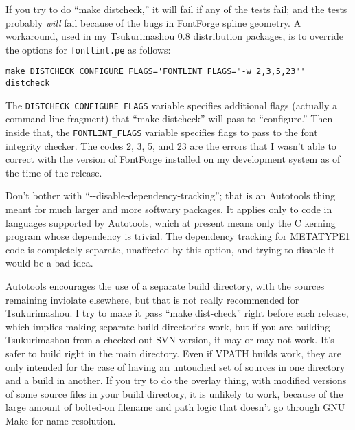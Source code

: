 \documentclass[14pt]{extarticle}
\begin{document}
If you try to do ``make distcheck,'' it will fail if any of the tests fail;
and the tests probably \emph{will} fail because of the bugs in FontForge
spline geometry.  A workaround, used in my Tsukurimashou 0.8 distribution
packages, is to override the options for \texttt{fontlint.pe} as follows:
\begin{verbatim}
make DISTCHECK_CONFIGURE_FLAGS='FONTLINT_FLAGS="-w 2,3,5,23"' distcheck
\end{verbatim}

The \texttt{DISTCHECK\_CONFIGURE\_FLAGS} variable specifies additional flags
(actually a command-line fragment) that ``make distcheck'' will pass to
``configure.''  Then inside that, the \texttt{FONTLINT\_FLAGS} variable
specifies flags to pass to the font integrity checker.  The codes 2, 3, 5,
and 23 are the errors that I wasn't able to correct with the version of
FontForge installed on my development system as of the time of the release.

Don't bother with ``-{}-disable-dependency-tracking''; that is an
Autotools thing meant for much larger and more softwary packages.  It
applies only to code in languages supported by Autotools, which at
present means only the C kerning program whose dependency is trivial. 
The dependency tracking for METATYPE1 code is completely separate,
unaffected by this option, and trying to disable it would be a bad
idea.

Autotools encourages the use of a separate build directory, with the
sources remaining inviolate elsewhere, but that is not really
recommended for Tsukurimashou.  I try to make it pass ``make
dist-check'' right before each release, which implies making separate
build directories work, but if you are building Tsukurimashou from a
checked-out SVN version, it may or may not work.  It's safer
to build right in the main directory.  Even if VPATH builds work, they
are only intended for the case of having an untouched set of sources in
one directory and a build in another.  If you try to do the overlay
thing, with modified versions of some source files in your build
directory, it is unlikely to work, because of the large amount of
bolted-on filename and path logic that doesn't go through GNU Make for
name resolution.
\end{document}
